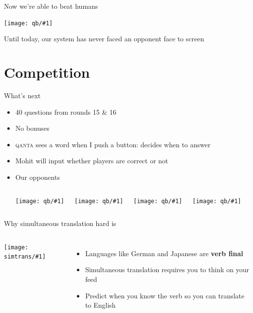 \documentclass[compress]{beamer}
\newcommand{\gfxs}[2]{
\begin{center}
	\texttt{[image: simtrans/\#1]}
\end{center}
}
\newcommand{\gfxq}[2]{
\begin{center}
	\texttt{[image: qb/\#1]}
\end{center}
}
\begin{document}
\begin{frame}{Now we're able to beat humans}

  \gfxq{human_history}{1.0}
  \pause
  
 Until today, our system has never faced an opponent face to screen

\end{frame}


\section{Competition}

\begin{frame}{What's next}

	\begin{itemize}
		\item 40 questions from rounds 15 \& 16
		\item No bonuses
		\item \textsc{qanta} sees a word when I push a button: decides when to answer
		\item Mohit will input whether players are correct or not
		\pause
		\item Our opponents
		\begin{columns}
				\gfxq{colby_jeo}{1.0}
				\gfxq{ben_jeo}{1.0}
				\gfxq{alex_jeo}{1.0}
				\gfxq{kristin_jeo}{1.0}						
		\end{columns}
	\end{itemize}

\end{frame}


\begin{frame}{Why simultaneous translation hard is}

  \begin{columns}
       \gfxs{nuremberg_translators}{.9}
       \begin{itemize}
         \item Languages like German and Japanese are {\bf verb final}
         \item Simultaneous translation requires you to think on your feed
         \item Predict when you know the verb so you can translate to English
       \end{itemize}
  \end{columns}

\end{frame}
\end{document}
